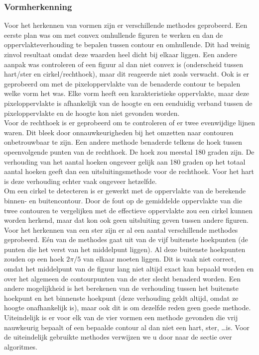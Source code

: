 \documentclass[eind]{penoverslag}
\begin{document}
\subsubsection{Vormherkenning}
Voor het herkennen van vormen zijn er verschillende methodes geprobeerd. Een eerste plan was om met convex omhullende figuren te werken en dan de oppervlakteverhouding te bepalen tussen contour en omhullende. Dit had weinig zinvol resultaat omdat deze waarden heel dicht bij elkaar liggen. Een andere aanpak was controleren of een figuur al dan niet convex is (onderscheid tussen hart/ster en cirkel/rechthoek), maar dit reageerde niet zoals verwacht. Ook is er geprobeerd om met de pixeloppervlakte van de benaderde contour te bepalen welke vorm het was. Elke vorm heeft een karakteristieke oppervlakte, maar deze pixeloppervlakte is afhankelijk van de hoogte en een eenduidig verband tussen de pixeloppervlakte en de hoogte kon niet gevonden worden. \\
Voor de rechthoek is er geprobeerd om te controleren of er twee evenwijdige lijnen waren. Dit bleek door onnauwkeurigheden bij het omzetten naar contouren onbetrouwbaar te zijn. Een andere methode benaderde telkens de hoek tussen opeenvolgende punten van de rechthoek. De hoek zou meestal 180 graden zijn. De verhouding van het aantal hoeken ongeveer gelijk aan 180 graden op het totaal aantal hoeken geeft dan een uitsluitingsmethode voor de rechthoek. Voor het hart is deze verhouding echter vaak ongeveer hetzelfde. \\
Om een cirkel te detecteren is er gewerkt met de oppervlakte van de berekende binnen- en buitencontour. Door de fout op de gemiddelde oppervlakte van die twee contouren te vergelijken met de effectieve oppervlakte zou een cirkel kunnen worden herkend, maar dat kon ook geen uitsluiting geven tussen andere figuren. \\
Voor het herkennen van een ster zijn er al een aantal verschillende methodes geprobeerd. E\'en van de methodes gaat uit van de vijf buitenste hoekpunten (de punten die het verst van het middelpunt liggen). Al deze buitenste hoekpunten zouden op een hoek $2\pi/5$ van elkaar moeten liggen. Dit is vaak niet correct, omdat het middelpunt van de figuur lang niet altijd exact kan bepaald worden en over het algemeen de contourpunten van de ster slecht benaderd worden. Een andere mogelijkheid is het berekenen van de verhouding tussen het buitenste hoekpunt en het binnenste hoekpunt (deze verhouding geldt altijd, omdat ze hoogte onafhankelijk is), maar ook dit is om dezelfde reden geen goede methode.\\
Uiteindelijk is er voor elk van de vier vormen een methode gevonden die vrij nauwkeurig bepaalt of een bepaalde contour al dan niet een hart, ster, \ldots is. Voor de uiteindelijk gebruikte methodes verwijzen we u door naar de sectie over algoritmes.
\end{document}
